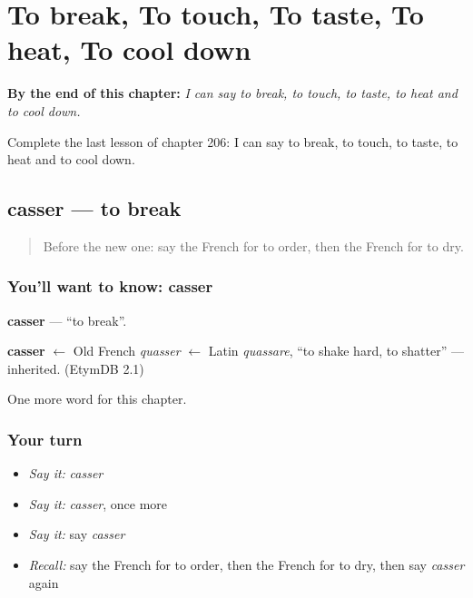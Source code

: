 
\chapter{To break, To touch, To taste, To heat, To cool down}
\label{ch:fr-to-break-to-touch-to-taste-to-heat-to-cool-down}

\begin{chapteropening}
\textbf{By the end of this chapter:} \emph{I can say to break, to touch, to taste, to heat and to cool down.}

Complete the last lesson of chapter 206: I can say to break, to touch, to taste, to heat and to cool down.
\end{chapteropening}

\section[casser]{casser — to break}

\label{lesson:FR-C206-casser}



\begin{quote}
Before the new one: say the French for to order, then the French for to dry.
\end{quote}

\subsection*{You'll want to know: casser}
\textbf{casser} — \textquotedblleft{}to break\textquotedblright{}.

\begin{cousinweb}
\textbf{casser} $\leftarrow$ Old French \emph{quasser} $\leftarrow$ Latin \emph{quassare}, \textquotedblleft{}to shake hard, to shatter\textquotedblright{} — inherited. (EtymDB 2.1)
\end{cousinweb}

\begin{grammarlens}[title={What you've built}]
One more word for this chapter.
\end{grammarlens}

\subsection*{Your turn}
\begin{itemize}
\raggedright
  \item \emph{Say it:} \emph{casser}
  \item \emph{Say it:} \emph{casser}, once more
  \item \emph{Say it:} say \emph{casser}
  \item \emph{Recall:} say the French for to order, then the French for to dry, then say \emph{casser} again
\end{itemize}

